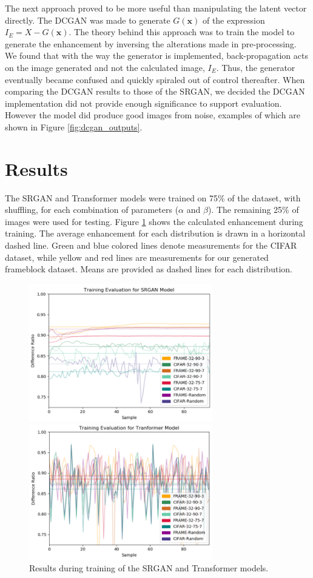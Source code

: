 \documentclass[letterpaper]{article} %
\begin{document}
The next approach proved to be more useful than manipulating the latent vector directly.
The DCGAN was made to generate $G(\mathbf{x})$ of
the expression $I_E = X - G(\mathbf{x})$. The theory behind this approach was to train
the model to generate the enhancement by inversing the alterations made in pre-processing.
We found that with the way the generator is implemented, back-propagation acts on the image generated
and not the calculated image, $I_E$.
Thus, the generator eventually became confused and quickly spiraled out of control thereafter.
When comparing the DCGAN results to those of the SRGAN,
we decided the DCGAN implementation did not provide enough significance to support evaluation.
However the model did produce good images from noise,
examples of which are shown in Figure \ref{fig:dcgan_outputs}.

\section{Results}
The SRGAN and Transformer models were trained on 75\% of the dataset, with shuffling,
for each combination of parameters ($\alpha$ and $\beta$).
The remaining 25\% of images were used for testing.
Figure \ref{fig:training_results} shows the calculated enhancement
during training.
The average enhancement for each distribution is drawn in
a horizontal dashed line.
Green and blue colored lines denote measurements for the CIFAR dataset, while
yellow and red lines are measurements for our generated frameblock dataset.
Means are provided as dashed lines for each distribution.

\begin{figure}[h!]
\centerline{\includegraphics[width=8cm]{srgan_training_results.png}}
\centerline{\includegraphics[width=8cm]{attn_training_results.png}}
\caption{Results during training of the SRGAN and Transformer models.}
\label{fig:training_results}
\end{figure}
\end{document}
